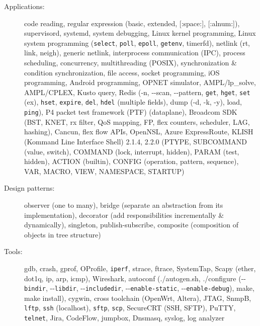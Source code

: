 \documentclass[letterpaper,11pt]{article}
\begin{document}
\begin{description}
\item[Applications:] code reading, regular expression (basic, extended, [:space:], [:alnum:]),
supervisord, systemd, system debugging, Linux kernel programming,
Linux system programming ({\tt select}, {\tt poll}, {\tt epoll}, {\tt getenv}, timerfd), netlink (rt, link, neigh), generic netlink,
interprocess communication (IPC), process scheduling,
concurrency, multithreading (POSIX), synchronization \& condition synchronization,
file access, socket programming,
%
iOS programming, Android programming,
OPNET simulator, AMPL/lp\_solve, AMPL/CPLEX, Kusto query,
%
Redis (-n, -{}-scan, -{}-pattern, {\tt get}, {\tt hget}, {\tt set} (ex), {\tt hset}, {\tt expire}, {\tt del}, {\tt hdel} (multiple fields),
dump (-d, -k, -y), load, {\tt ping}),
%
P4 packet test framework (PTF) (dataplane),
Broadcom SDK (BST, KNET, rx filter, QoS mapping, FP, flex counters, scheduler, LAG, hashing), Cancun, flex flow APIs, OpenNSL,
Azure ExpressRoute,
%
KLISH (Kommand Line Interface Shell) 2.1.4, 2.2.0 (PTYPE, SUBCOMMAND (value, switch), COMMAND (lock, interrupt, hidden), PARAM (test, hidden),
ACTION (builtin),
CONFIG (operation, pattern, sequence),
VAR, MACRO, VIEW, NAMESPACE, STARTUP)

\item[Design patterns:] observer (one to many), bridge (separate an abstraction from its implementation),
decorator (add responsibilities incrementally \& dynamically), singleton, publish-subscribe, composite (composition of objects in tree structure)

\item[Tools:] gdb, crash, gprof, OProfile, {\tt iperf},
strace, ftrace, SystemTap,
Scapy (ether, dot1q, ip, arp, icmp), Wireshark, autoconf (./autogen.sh,
./configure (-{}-{\tt bindir}, -{}-{\tt libdir}, -{}-{\tt includedir}, -{}-{\tt enable-static}, -{}-{\tt enable-debug}),
make, make install), cygwin, cross toolchain (OpenWrt, Altera),
JTAG, SnmpB,
{\tt lftp}, {\tt ssh} (localhost), {\tt sftp}, {\tt scp}, SecureCRT (SSH, SFTP), PuTTY, {\tt telnet},
Jira, CodeFlow,
jumpbox, Dnsmasq, syslog, log analyzer


\end{description}
\end{document}
